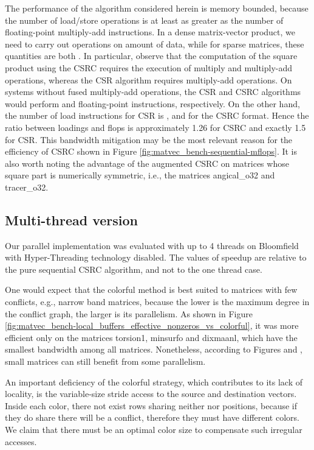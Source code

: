 \documentclass[11pt]{article}
\begin{document}
The performance of the algorithm considered herein is memory bounded, because the
number of load/store operations is at least as greater as the number of
floating-point multiply-add instructions.  In a dense matrix-vector product, we
need to carry out  operations on  amount of data, while for sparse
matrices, these quantities are both .
In particular, observe that the computation
of the square  product using the CSRC requires the execution of  multiply and 
multiply-add operations, whereas the CSR algorithm requires  multiply-add
operations.  On systems without fused multiply-add operations, the CSR and CSRC
algorithms would perform  and  floating-point instructions,
respectively.  On the other hand, the number of load instructions for CSR is
, and  for the CSRC format. Hence the
ratio between loadings and flops is approximately 1.26 for CSRC and exactly 1.5
for CSR.  This bandwidth mitigation may be the most relevant reason for the
efficiency of CSRC shown in Figure \ref{fig:matvec_bench-sequential-mflops}.
It is also worth noting the advantage of the augmented CSRC on
matrices whose square part is numerically symmetric,
i.e., the matrices angical\_o32 and tracer\_o32.

\subsection{Multi-thread version}

Our parallel implementation was evaluated with up to 4 threads on Bloomfield
with Hyper-Threading technology disabled.
The values of speedup
are relative to the pure sequential CSRC algorithm, and not to the one thread case.

One would expect that the colorful method is best suited to matrices with
few conflicts, e.g., narrow band matrices,
because the lower is the maximum degree in the conflict graph, the larger is its parallelism.
As shown in Figure
\ref{fig:matvec_bench-local_buffers_effective_nonzeros_vs_colorful},
it was more efficient only on the matrices torsion1, minsurfo and dixmaanl, which have the smallest bandwidth among all matrices.
Nonetheless, according to Figures  and , small matrices can still benefit from some parallelism.

An important deficiency of the colorful strategy, which contributes to its lack of
locality, is the variable-size stride access to the source and destination
vectors.
Inside each color, there not exist rows
sharing neither  nor  positions, because if they do share there will be a
conflict, therefore they must have different colors.
We claim that there must be an optimal color size to compensate such irregular accesses.
\end{document}
